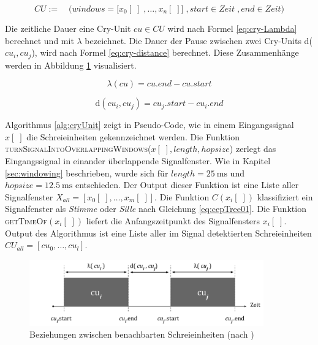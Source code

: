 \begin{equation}
CU := \quad \Big(windows = \big[x_0[\;] \; ,\ldots, x_n[\;] \big] \;, start \in Zeit \;, end \in Zeit \Big)
\label{eq:cry-Unit}
\end{equation}

Die zeitliche Dauer eine Cry-Unit $cu \in CU$ wird nach Formel \ref{eq:cry-Lambda} berechnet und mit $\lambda$ bezeichnet. Die Dauer der Pause zwischen zwei Cry-Units d($cu_i, cu_j$), wird nach Formel \ref{eq:cry-distance} berechnet. Diese Zusammenhänge werden in Abbildung \ref{img:cryUnit-details} visualisiert.\cite[S. 2]{vad_entropy}

\begin{equation}
\lambda (cu) = cu.end - cu.start
\label{eq:cry-Lambda}
\end{equation}

\begin{equation}
\text{d}(cu_i, cu_j) = cu_j.start - cu_i.end
\label{eq:cry-distance}
\end{equation}

Algorithmus \ref{alg:cryUnit} zeigt in Pseudo-Code, wie in einem Eingangssignal $x[\;]$ die Schreieinheiten   gekennzeichnet werden. Die Funktion \textsc{turnSignalIntoOverlappingWindows}($x[\;], length, hopsize$) zerlegt das Eingangssignal in einander überlappende Signalfenster. Wie in Kapitel \ref{sec:windowing} beschrieben, wurde sich für $length = \SI{25}{\milli\second}$ und $hopsize = \SI{12.5}{\milli\second}$ entschieden. Der Output dieser Funktion ist eine Liste aller Signalfenster $X_{all} = [x_0[\;] ,\ldots, x_m[\;]]$. Die Funktion $C(x_i[\;])$ klassifiziert ein Signalfenster als \emph{Stimme} oder \emph{Sille} nach Gleichung \ref{eq:cepTree01}. Die Funktion \textsc{getTimeOf}$(x_i[\;])$ liefert die Anfangszeitpunkt des Signalfensters $x_i[\;]$. Output des Algorithmus ist eine Liste aller im Signal detektierten Schreieinheiten $CU_{all} = [cu_0 , \ldots, cu_l]$. 

\begin{figure}[H]
	\centering
	\includegraphics[width=0.9\textwidth]{bilder/newSmoothing05.png}
	\caption[Beziehungen zwischen benachbarten Schreieinheiten]{Beziehungen zwischen benachbarten Schreieinheiten (nach \cite[S. 2]{vad_entropy})}
	\label{img:cryUnit-details}
\end{figure}


